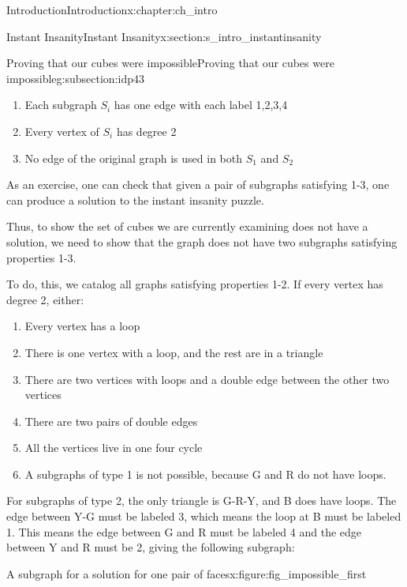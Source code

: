 \documentclass[oneside,10pt,]{book}
\numberwithin{equation}{section}
\begin{document}
\begin{chapterptx}{Introduction}{}{Introduction}{}{}{x:chapter:ch_intro}
\begin{sectionptx}{Instant Insanity}{}{Instant Insanity}{}{}{x:section:s_intro_instantinsanity}
\begin{subsectionptx}{Proving that our cubes were impossible}{}{Proving that our cubes were impossible}{}{}{g:subsection:idp43}
\begin{enumerate}
\item{}Each subgraph \(S_i\) has one edge with each label 1,2,3,4%
\item{}Every vertex of \(S_i\) has degree 2%
\item{}No edge of the original graph is used in both \(S_1\) and \(S_2\)%
\end{enumerate}
As an exercise, one can check that given a pair of subgraphs satisfying 1-3, one can produce a solution to the instant insanity puzzle.%
\par
Thus, to show the set of cubes we are currently examining does not have a solution, we need to show that the graph does not have two subgraphs satisfying properties 1-3.%
\par
To do, this, we catalog all graphs satisfying properties 1-2. If every vertex has degree 2, either:%
\begin{enumerate}
\item{}Every vertex has a loop%
\item{}There is one vertex with a loop, and the rest are in a triangle%
\item{}There are two vertices with loops and a double edge between the other two vertices%
\item{}There are two pairs of double edges%
\item{}All the vertices live in one four cycle%
\item{}A subgraphs of type 1 is not possible, because G and R do not have loops.%
\end{enumerate}
%
\par
For subgraphs of type 2, the only triangle is G-R-Y, and B does have loops. The edge between Y-G must be labeled 3, which means the loop at B must be labeled 1. This means the edge between G and R must be labeled 4 and the edge between Y and R must be 2, giving the following subgraph:%
\begin{figureptx}{A subgraph for a solution for one pair of faces}{x:figure:fig_impossible_first}{}%
\begin{image}{0.3}{0.4}{0.3}%

\end{image}
\end{figureptx}
\end{subsectionptx}
\end{sectionptx}
\end{chapterptx}
\end{document}

